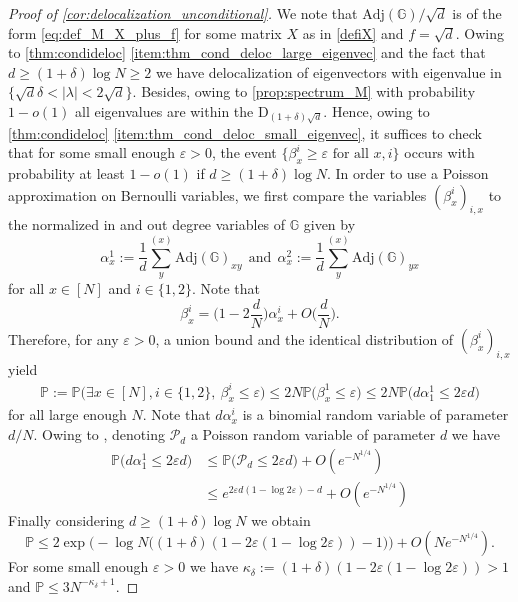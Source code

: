 \documentclass[10pt,a4paper]{amsart}
\newcommand{\eps}{\varepsilon}
\numberwithin{equation}{section}
\newcommand{\nc}{\normalcolor}
\begin{document}
	
	\begin{proof}[Proof of \cref{cor:delocalization_unconditional}] 
	We note that $\mathrm{Adj}(\mathbb G)/\sqrt{d}$ is of the form \eqref{eq:def_M_X_plus_f} for some matrix $X$ as in \cref{defiX} and $f = \sqrt{d}$. Owing to \cref{thm:condideloc} \cref{item:thm_cond_deloc_large_eigenvec} and the fact that $d \geq (1+\delta) \log N \ge 2$ we have delocalization of eigenvectors with eigenvalue in $\{\sqrt{d}\delta < |\lambda| < 2 \sqrt{d}\} $. Besides, owing to \cref{prop:spectrum_M} with probability $1 - o(1)$ all eigenvalues are within the $\mathrm{D}_{(1+\delta) \sqrt{d}}$. \nc Hence, owing to \cref{thm:condideloc} \cref{item:thm_cond_deloc_small_eigenvec}, 
		it suffices to check 
		that for some small enough $\eps>0$,  the event $\{ \beta_x^i \geq \eps \text{ for all } x,i \}$ occurs with probability at least $1-o(1)$ if $d \geq (1 + \delta) \log N$. In order to use a Poisson approximation on Bernoulli variables, we first compare the variables $(\beta_{x}^i)_{i,x}$ to the normalized in and out degree variables of  $\mathbb{G}$ given by 
		\begin{equation*}
			\alpha_{x}^1 := \frac{1}{d} \sum_{y}^{(x)} \mathrm{Adj}(\mathbb G)_{xy}  ~~\text{and}~~\alpha_{x}^2 := \frac{1}{d} \sum_{y}^{(x)} \mathrm{Adj}(\mathbb G)_{yx}
		\end{equation*}
	 for all $x \in [N]$ and $i\in \{1,2\}$. Note that  
		\begin{equation*}
			\beta_{x}^i = \biggl(1-2 \frac{d}{N}\biggr)\alpha_{x}^i +   O\bigg(\frac{d}{N}\bigg). 
		\end{equation*}
	Therefore, for any $\eps >0$, a union bound and the identical distribution of  $(\beta_x^i)_{i,x}$ yield 
		\begin{align*}
			\mathbb{P}:= \mathbb{P}\big( \exists x \in [N], i \in \{1,2\},~ \beta_{x}^i \le \eps  \big) \le 2N \mathbb{P}\big(\beta_x^1 \le \eps \big) \le 2N\mathbb{P} \big( d \alpha_1^1 \le 2 \eps d\big)
		\end{align*}
		 for all large enough $N$. 
		Note that $d\alpha_x^i$ is a binomial random variable of parameter $d/N$. Owing to \cite[Lemma D.3]{alt2023poisson}, denoting $\mathcal P_{d}$ a Poisson random variable of parameter $d$ we have
		\begin{align*}
			\mathbb{P} \big( d \alpha_1^1 \le 2 \eps d\big) &\le \mathbb{P} \big(\mathcal{P}_d \le 2 \eps d\big) +  O (e^{-N^{1/4}})\\
			&\le e^{2\eps d(1- \log 2\eps) -d} +  O (e^{-N^{1/4}})
		\end{align*}
		Finally considering $d \ge (1+ \delta) \log N$ we obtain 
		\begin{equation*}
			\mathbb{P}\le 2 \exp\big(-\log N \big( (1+ \delta ) (1 - 2 \eps ( 1- \log2\eps)) -1 \big)\big) +  O ( N e^{-N^{1/4}}).
		\end{equation*}
		For some small enough $\eps>0$  we have $\kappa_{\delta} :=(1+ \delta ) (1 - 2 \eps ( 1- \log2\eps)) >1 $ and $\mathbb{P} \le 3N^{-\kappa_{\delta} +1}$.
	\end{proof} 
	
\end{document}
